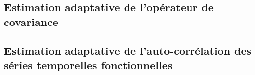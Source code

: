 


\subsection{Estimation adaptative de l'opérateur de covariance}



\subsection{Estimation adaptative de l'auto-corrélation des séries temporelles fonctionnelles}

